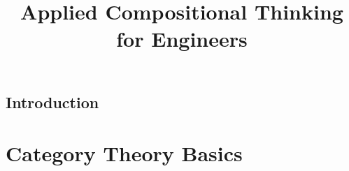 
\title{Applied Compositional Thinking\\ for Engineers}
\date{}
 
 

\setcounter{tocdepth}{1}
\tableofcontents

\chapter*{Introduction}



% 

\part{Category Theory Basics}

\chapter{}

\clearpage

\chapter{}

\clearpage

\chapter{}

\clearpage
%
\chapter{}

\clearpage
%
%
%
%
\chapter{}


\clearpage
%

